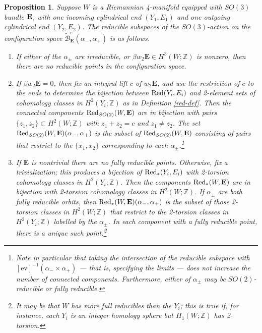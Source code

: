 \documentclass{memo-l}
\newtheorem{proposition}[theorem]{Proposition}
\theoremstyle{definition}
\theoremstyle{remark}
\numberwithin{section}{chapter}
\numberwithin{equation}{chapter}
\begin{document}
\begin{proposition}\label{action3}Suppose $W$ is a Riemannian 4-manifold equipped with $SO(3)$ bundle $\bf E$, with one incoming cylindrical end $(Y_1, E_1)$ and one outgoing cylindrical end $(Y_2,E_2)$. The reducible subspaces of the $SO(3)$-action on the configuration space $\widetilde{\mathcal B}^{e}_{\mathbf{E}}(\alpha_-, \alpha_+)$ is as follows.\begin{enumerate}
    \item If either of the $\alpha_\pm$ are irreducible, or $\beta w_2 \mathbf{E} \in H^3(W;\mathbb Z)$ is nonzero, then there are no reducible points in the configuration space.

    \item If $\beta w_2 \mathbf{E} = 0$, then fix an integral lift $c$ of $w_2 \mathbf{E}$, and use the restriction of $c$ to the ends to determine the bijection between $\textup{Red}(Y_i, E_i)$ and 2-element sets of cohomology classes in $H^2(Y_i; \mathbb Z)$ as in Definition \ref{red-def}. Then the connected components $\textup{Red}_{SO(2)}(W,\mathbf{E})$ are in bijection with pairs $\{z_1, z_2\} \subset H^2(W;\mathbb Z)$ with $z_1 + z_2 = c$ and $z_1 \neq z_2$. The set $\textup{Red}_{SO(2)}(W,\mathbf{E})(\alpha_-, \alpha_+)$ is the subset of $\textup{Red}_{SO(2)}(W,\mathbf{E})$ consisting of pairs that restrict to the $\{x_1, x_2\}$ corresponding to each $\alpha_\pm$.\footnote{Note in particular that taking the intersection of the reducible subspace with $[\text{ev}]^{-1}(\alpha_- \times \alpha_+)$ --- that is, specifying the limits --- does not increase the number of connected components. Furthermore, either of $\alpha_\pm$ may be $SO(2)$-reducible or fully reducible.}

    \item If $\mathbf{E}$ is nontrivial there are no fully reducible points. Otherwise, fix a trivialization; this produces a bijection of $\textup{Red}_{*}(Y_i, E_i)$ with 2-torsion cohomology classes in $H^2(Y_i;\mathbb Z)$. Then the components $\textup{Red}_*(W,\mathbf{E})$ are in bijection with 2-torsion cohomology classes in $H^2(W;\mathbb Z)$. If $\alpha_\pm$ are both fully reducible orbits, then $\textup{Red}_*(W,\mathbf{E})(\alpha_-, \alpha_+)$ is the subset of those 2-torsion classes in $H^2(W;\mathbb Z)$ that restrict to the 2-torsion classes in $H^2(Y_i;\mathbb Z)$ labelled by the $\alpha_\pm$. In each component with a fully reducible point, there is a unique such point.\footnote{It may be that $W$ has more full reducibles than the $Y_i$; this is true if, for instance, each $Y_i$ is an integer homology sphere but $H_1(W;\mathbb Z)$ has 2-torsion.}
\end{enumerate}
\end{proposition}
\end{document}

